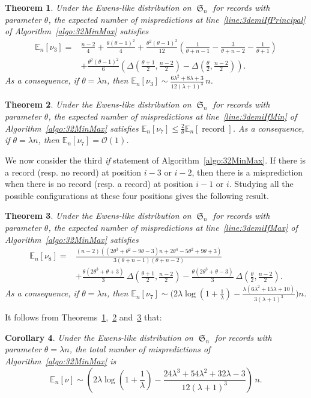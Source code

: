 \documentclass[proceedings]{aofa}
\renewcommand{\O}{\mathcal{O}}
\newcommand{\EE}{\mathbb{E}}
\DeclareMathOperator{\sym}{\mathfrak{S}}
\DeclareMathOperator{\rec}{record}
\newtheorem{theorem}{Theorem}
\newtheorem{corollary}[theorem]{Corollary}
\begin{document}
\begin{theorem}\label{thm:32-first-if}
Under the Ewens-like distribution on $\sym_n$ for records with parameter $\theta$, 
the expected number of mispredictions at line~\ref{line:3demiIfPrincipal} of Algorithm~\ref{algo:32MinMax} satisfies
\begin{align*}\textstyle
\EE_{n}[\nu_{3}] = &  \frac{n-2}{4} + \frac{\theta(\theta-1)^2}{4} + \frac{\theta^2(\theta-1)^2}{12} \left( \frac{1}{\theta+n-1} -\frac{3}{\theta+n-2} -\frac{1}{\theta+1}\right)\\
& +  \frac{\theta^2(\theta-1)^2}{6} \left(\Delta\left(\frac{\theta+1}2,\frac{n-2}{2}\right)-\Delta\left(\frac{\theta}2,\frac{n-2}{2}\right)\right).
\end{align*}
As a consequence,
if $\theta=\lambda n$, then $\EE_{n}[\nu_{3}] \sim \frac{6\lambda^{2} + 8\lambda + 3}{12(\lambda + 1)^{3}}\,n$. 
\end{theorem}


\begin{theorem}\label{thm:32-second-if}
Under the Ewens-like distribution on $\sym_n$ for records with parameter $\theta$, 
the expected number of mispredictions at line~\ref{line:3demiIfMin} of Algorithm~\ref{algo:32MinMax} satisfies
$\EE_{n}[\nu_{7}]\leq \frac2{\theta} \EE_{n}[\rec] $. As a consequence, if $\theta=\lambda n$, then $\EE_{n}[\nu_{7}] = \O(1)$. 
\end{theorem}

We now consider the third \emph{if} statement of Algorithm~\ref{algo:32MinMax}. 
If there is a record (resp. no record) at position $i-3$ or $i-2$, then there is a misprediction when there is no record (resp. a record) at position $i-1$ or $i$. Studying all the possible configurations at these four positions gives the following result. 
\begin{theorem}\label{thm:32-third-if}
Under the Ewens-like distribution on $\sym_n$ for records with parameter $\theta$, 
the expected number of mispredictions at line~\ref{line:3demiIfMax} of Algorithm~\ref{algo:32MinMax} satisfies
\begin{align*}\textstyle
\EE_{n}[\nu_{8}] = & \frac{(n-2)((2\theta^{3}+\theta^{2}-9\theta-3)n+2\theta^{4}-5\theta^{2}+9\theta+3)}{3(\theta+n-1)(\theta+n-2)}\\
&+ \frac{\theta(2\theta^{3}+\theta+3)}{3}\ \Delta\left(\frac{\theta+1}{2},\frac{n-2}{2}\right)
- \frac{\theta(2\theta^{3}+\theta-3)}{3}\ \Delta\left(\frac{\theta}{2},\frac{n-2}{2}\right).
\end{align*}
As a consequence,
if $\theta=\lambda n$, then $\EE_{n}[\nu_{7}] \sim \big(2\lambda\log\left(1+\frac1\lambda\right)
-\frac{\lambda(6\lambda^{2}+15\lambda+10)}{3(\lambda+1)^{3}} \big)n$.
\end{theorem}
It follows from Theorems~\ref{thm:32-first-if},~\ref{thm:32-second-if} and~\ref{thm:32-third-if} that:
\begin{corollary}
Under the Ewens-like distribution on $\sym_n$ for records with parameter $\theta=\lambda n$, 
the total number of mispredictions of Algorithm~\ref{algo:32MinMax} is 
\[\EE_{n}[\nu] \sim\left(2\lambda\log\left(1+\frac1\lambda\right)-\frac{24\lambda^{3}+54\lambda^{2}+32\lambda-3}{12(\lambda+1)^{3}}\right)\,n. 
\]
\end{corollary}
\end{document}
